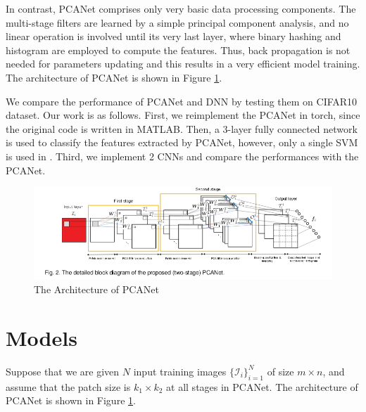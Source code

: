 \documentclass[10pt,twocolumn,letterpaper]{article}
\begin{document}
In contrast, PCANet comprises only very basic data processing components. The multi-stage filters are learned by a simple principal component analysis, and no linear operation is involved until its very last layer, where binary hashing and histogram are employed to compute the features. Thus, back propagation is not needed for parameters updating and this results in a very efficient model training. The architecture of PCANet is shown in Figure \ref{Fig: PCA Architecture}.

We compare the performance of PCANet and DNN by testing them on CIFAR10 dataset. Our work is as follows. First, we reimplement the PCANet in torch, since the original code is written in MATLAB. Then, a 3-layer fully connected network is used to classify the features extracted by PCANet, however, only a single SVM is used in \cite{chan2015pcanet}. Third, we implement 2 CNNs and compare the performances with the PCANet. 


\begin{figure}
\begin{center}
\includegraphics[scale=1.7,width=14cm]{pcanetstructure.png}
\end{center}
   \caption{The Architecture of PCANet}
\label{Fig: PCA Architecture}
\end{figure}


\section{Models} 
Suppose that we are given $N$ input training images $\{\mathcal{I}_i\}_{i=1}^N $ of size $m \times n$, and assume that the patch size is $k_1 \times k_2$ at all stages in PCANet. The architecture of PCANet is shown in Figure \ref{Fig: PCA Architecture}. 
\end{document}
